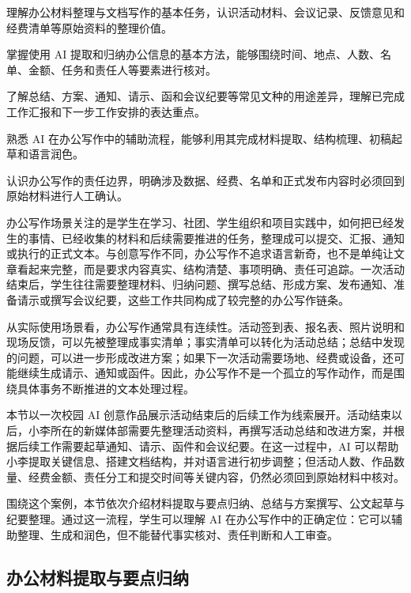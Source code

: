 \begin{sectionkeypoints}
\item 理解办公材料整理与文档写作的基本任务，认识活动材料、会议记录、反馈意见和经费清单等原始资料的整理价值。
\item 掌握使用 AI 提取和归纳办公信息的基本方法，能够围绕时间、地点、人数、名单、金额、任务和责任人等要素进行核对。
\item 了解总结、方案、通知、请示、函和会议纪要等常见文种的用途差异，理解已完成工作汇报和下一步工作安排的表达重点。
\item 熟悉 AI 在办公写作中的辅助流程，能够利用其完成材料提取、结构梳理、初稿起草和语言润色。
\item 认识办公写作的责任边界，明确涉及数据、经费、名单和正式发布内容时必须回到原始材料进行人工确认。
\end{sectionkeypoints}

办公写作场景关注的是学生在学习、社团、学生组织和项目实践中，如何把已经发生的事情、已经收集的材料和后续需要推进的任务，整理成可以提交、汇报、通知或执行的正式文本。与创意写作不同，办公写作不追求语言新奇，也不是单纯让文章看起来完整，而是要求内容真实、结构清楚、事项明确、责任可追踪。一次活动结束后，学生往往需要整理材料、归纳问题、撰写总结、形成方案、发布通知、准备请示或撰写会议纪要，这些工作共同构成了较完整的办公写作链条。

从实际使用场景看，办公写作通常具有连续性。活动签到表、报名表、照片说明和现场反馈，可以先被整理成事实清单；事实清单可以转化为活动总结；总结中发现的问题，可以进一步形成改进方案；如果下一次活动需要场地、经费或设备，还可能继续生成请示、通知或函件。因此，办公写作不是一个孤立的写作动作，而是围绕具体事务不断推进的文本处理过程。

本节以一次校园 AI 创意作品展示活动结束后的后续工作为线索展开。活动结束以后，小李所在的新媒体部需要先整理活动资料，再撰写活动总结和改进方案，并根据后续工作需要起草通知、请示、函件和会议纪要。在这一过程中，AI 可以帮助小李提取关键信息、搭建文档结构，并对语言进行初步调整；但活动人数、作品数量、经费金额、责任分工和提交时间等关键内容，仍然必须回到原始材料中核对。

围绕这个案例，本节依次介绍材料提取与要点归纳、总结与方案撰写、公文起草与纪要整理。通过这一流程，学生可以理解 AI 在办公写作中的正确定位：它可以辅助整理、生成和润色，但不能替代事实核对、责任判断和人工审查。


\subsection{办公材料提取与要点归纳}

